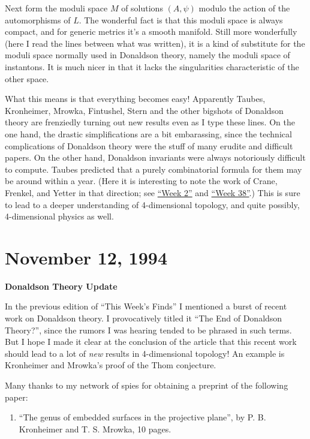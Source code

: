 \documentclass{article}
\def\tightlist{}
\begin{document}
Next form the moduli space \(M\) of solutions \((A, \psi)\) modulo the
action of the automorphisms of \(L\). The wonderful fact is that this
moduli space is always compact, and for generic metrics it's a smooth
manifold. Still more wonderfully (here I read the lines between what was
written), it is a kind of substitute for the moduli space normally used
in Donaldson theory, namely the moduli space of instantons. It is much
nicer in that it lacks the singularities characteristic of the other
space.

What this means is that everything becomes easy! Apparently Taubes,
Kronheimer, Mrowka, Fintushel, Stern and the other bigshots of Donaldson
theory are frenziedly turning out new results even as I type these
lines. On the one hand, the drastic simplifications are a bit
embarassing, since the technical complications of Donaldson theory were
the stuff of many erudite and difficult papers. On the other hand,
Donaldson invariants were always notoriously difficult to compute.
Taubes predicted that a purely combinatorial formula for them may be
around within a year. (Here it is interesting to note the work of Crane,
Frenkel, and Yetter in that direction; see
\protect\hyperlink{week2}{``Week 2''} and
\protect\hyperlink{week38}{``Week 38''}.) This is sure to lead to a
deeper understanding of 4-dimensional topology, and quite possibly,
4-dimensional physics as well.
\hypertarget{week45}{%
\section{November 12, 1994}\label{week45}}

\textbf{Donaldson Theory Update}

In the previous edition of ``This Week's Finds'' I mentioned a burst of
recent work on Donaldson theory. I provocatively titled it ``The End of
Donaldson Theory?'', since the rumors I was hearing tended to be phrased
in such terms. But I hope I made it clear at the conclusion of the
article that this recent work should lead to a lot of \emph{new} results
in 4-dimensional topology! An example is Kronheimer and Mrowka's proof
of the Thom conjecture.

Many thanks to my network of spies for obtaining a preprint of the
following paper:

\begin{enumerate}
\def\labelenumi{\arabic{enumi})}
\tightlist
\item
  ``The genus of embedded surfaces in the projective plane'', by P. B.
  Kronheimer and T. S. Mrowka, 10 pages.
\end{enumerate}
\end{document}
